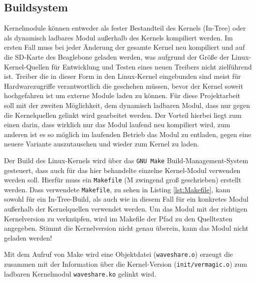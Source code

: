 \subsection{Buildsystem}
Kernelmodule können entweder als fester Bestandteil des Kernels (In-Tree) oder als dynamisch ladbares Modul außerhalb des Kernels kompiliert werden. Im ersten Fall muss bei jeder Änderung der gesamte Kernel neu kompiliert und auf die SD-Karte des Beaglebone geladen werden, was aufgrund der Größe der Linux-Kernel-Quellen für Entwicklung und Testen eines neuen Treibers nicht zielführend ist. Treiber die in dieser Form in den Linux-Kernel eingebunden sind meist für Hardwarezugriffe verantwortlich die geschehen müssen, bevor der Kernel soweit hochgefahren ist um externe Module laden zu können. %
Für diese Projektarbeit soll mit der zweiten Möglichkeit, dem dynamisch ladbaren Modul, dass nur gegen die Kernelquellen gelinkt wird gearbeitet werden. Der Vorteil hierbei liegt zum einen darin, dass wirklich nur das Modul laufend neu kompiliert wird, zum anderen ist es so möglich im laufenden Betrieb das Modul zu entladen, gegen eine neuere Variante auszutauschen und wieder zum Kernel zu laden. 

Der Build des Linux-Kernels wird über das \texttt{GNU Make} Build-Management-System gesteuert, dass auch für das hier behandelte einzelne Kernel-Modul verwenden werden soll. Hierfür muss ein \texttt{Makefile} (M zwingend groß geschrieben) erstellt werden. Dass verwendete \texttt{Makefile}, zu sehen in Listing \ref{lst:Makefile}, kann sowohl für ein In-Tree-Build, als auch wie in diesem Fall für ein konkretes Modul außerhalb der Kernelquellen verwendet werden. Um das Modul mit der richtigen Kernelversion zu verknüpfen, wird im Makefile der Pfad zu den Quelltexten angegeben. Stimmt die Kernelversion nicht genau überein, kann das Modul nicht geladen werden! 

Mit dem Aufruf von Make wird eine Objektdatei (\texttt{waveshare.o}) erzeugt die zusammen mit der Information über die Kernel-Version (\texttt{init/vermagic.o}) zum ladbaren Kernelmodul \texttt{waveshare.ko} gelinkt wird. %

